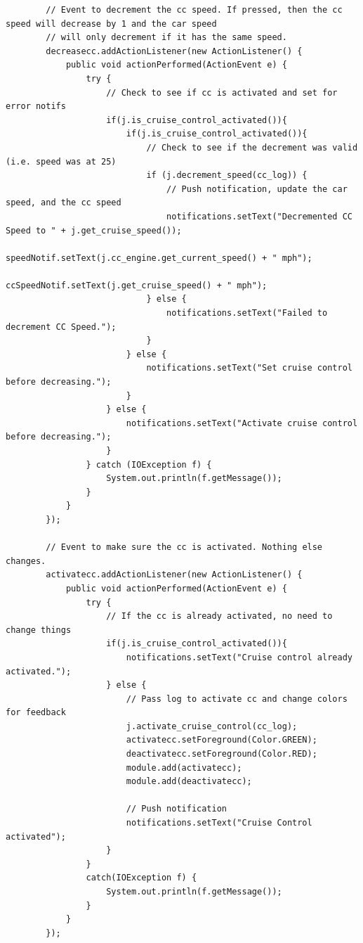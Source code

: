 \documentclass[preprint,11pt,3p]{article}
\begin{document}
\begin{lstlisting}
        // Event to decrement the cc speed. If pressed, then the cc speed will decrease by 1 and the car speed
        // will only decrement if it has the same speed.
        decreasecc.addActionListener(new ActionListener() {
        	public void actionPerformed(ActionEvent e) {
        		try {
        			// Check to see if cc is activated and set for error notifs
                    if(j.is_cruise_control_activated()){ 
                        if(j.is_cruise_control_activated()){ 
                        	// Check to see if the decrement was valid (i.e. speed was at 25)
                        	if (j.decrement_speed(cc_log)) {
                        		// Push notification, update the car speed, and the cc speed
                        		notifications.setText("Decremented CC Speed to " + j.get_cruise_speed());
                            	speedNotif.setText(j.cc_engine.get_current_speed() + " mph");
                            	ccSpeedNotif.setText(j.get_cruise_speed() + " mph");
                        	} else {
                        		notifications.setText("Failed to decrement CC Speed.");
                        	}
                        } else { 
                            notifications.setText("Set cruise control before decreasing.");
                        }
                    } else { 
                        notifications.setText("Activate cruise control before decreasing.");
                    }
        		} catch (IOException f) {
        			System.out.println(f.getMessage());
        		}
        	}
        });

        // Event to make sure the cc is activated. Nothing else changes.
        activatecc.addActionListener(new ActionListener() {
            public void actionPerformed(ActionEvent e) {
                try {
                	// If the cc is already activated, no need to change things
                    if(j.is_cruise_control_activated()){ 
                        notifications.setText("Cruise control already activated.");
                    } else {
                    	// Pass log to activate cc and change colors for feedback
                        j.activate_cruise_control(cc_log);
                        activatecc.setForeground(Color.GREEN);
                        deactivatecc.setForeground(Color.RED);
                        module.add(activatecc);
                        module.add(deactivatecc);

                        // Push notification
                        notifications.setText("Cruise Control activated");
                    }
                }
                catch(IOException f) {
                    System.out.println(f.getMessage());
                }
            }
        });


\end{lstlisting}
\end{document}
